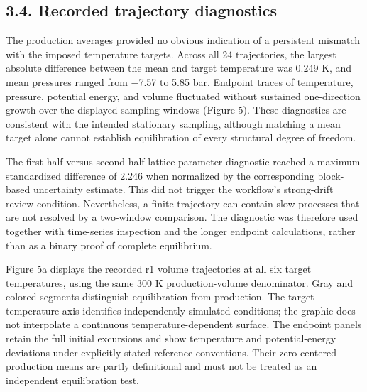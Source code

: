 \documentclass[10pt,a4paper,twocolumn]{article}
\begin{document}
\subsection*{3.4. Recorded trajectory diagnostics}

The production averages provided no obvious indication of a persistent mismatch with the imposed temperature targets. Across all 24 trajectories, the largest absolute difference between the mean and target temperature was 0.249 K, and mean pressures ranged from −7.57 to 5.85 bar. Endpoint traces of temperature, pressure, potential energy, and volume fluctuated without sustained one-direction growth over the displayed sampling windows (Figure 5). These diagnostics are consistent with the intended stationary sampling, although matching a mean target alone cannot establish equilibration of every structural degree of freedom.


The first-half versus second-half lattice-parameter diagnostic reached a maximum standardized difference of 2.246 when normalized by the corresponding block-based uncertainty estimate. This did not trigger the workflow's strong-drift review condition. Nevertheless, a finite trajectory can contain slow processes that are not resolved by a two-window comparison. The diagnostic was therefore used together with time-series inspection and the longer endpoint calculations, rather than as a binary proof of complete equilibrium.


Figure 5a displays the recorded r1 volume trajectories at all six target temperatures, using the same 300 K production-volume denominator. Gray and colored segments distinguish equilibration from production. The target-temperature axis identifies independently simulated conditions; the graphic does not interpolate a continuous temperature-dependent surface. The endpoint panels retain the full initial excursions and show temperature and potential-energy deviations under explicitly stated reference conventions. Their zero-centered production means are partly definitional and must not be treated as an independent equilibration test.
\end{document}
